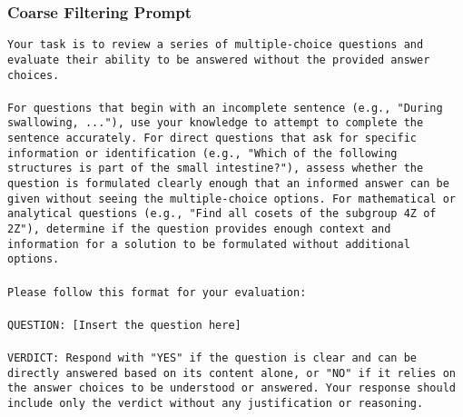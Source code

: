 \subsubsection{Coarse Filtering Prompt}\label{prompt:coarse_filter}
\begin{tcolorbox}[colback=white, colframe=black, title=Coarse Prompt]
\texttt{Your task is to review a series of multiple-choice questions and evaluate their ability to be answered without the provided answer choices. \\ \\ 
For questions that begin with an incomplete sentence (e.g., "During swallowing, ..."), use your knowledge to attempt to complete the sentence accurately. For direct questions that ask for specific information or identification (e.g., "Which of the following structures is part of the small intestine?"), assess whether the question is formulated clearly enough that an informed answer can be given without seeing the multiple-choice options. For mathematical or analytical questions (e.g., "Find all cosets of the subgroup 4Z of 2Z"), determine if the question provides enough context and information for a solution to be formulated without additional options. \\ \\
Please follow this format for your evaluation: \\ \\
QUESTION: [Insert the question here] \\ \\
VERDICT: Respond with "YES" if the question is clear and can be directly answered based on its content alone, or "NO" if it relies on the answer choices to be understood or answered. Your response should include only the verdict without any justification or reasoning.}
\end{tcolorbox}

